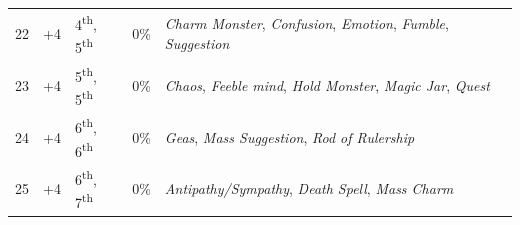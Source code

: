 \begin{minipage}{\columnwidth}
\begin{tabular}{|m{}|m{}|m{}|m{}|m{}|}
22	& +4	& 4\textsuperscript{th}, 5\textsuperscript{th}	& 0\%	& \textit{Charm Monster}, \textit{Confusion}, \textit{Emotion}, \textit{Fumble}, \textit{Suggestion} \\
\rowcolor[gray]{.9}23	& +4	& 5\textsuperscript{th}, 5\textsuperscript{th}	& 0\%	& \textit{Chaos}, \textit{Feeble mind}, \textit{Hold Monster}, \textit{Magic Jar}, \textit{Quest} \\
24	& +4	& 6\textsuperscript{th}, 6\textsuperscript{th}	& 0\%	& \textit{Geas}, \textit{Mass Suggestion}, \textit{Rod of Rulership} \\
\rowcolor[gray]{.9}25	& +4	& 6\textsuperscript{th}, 7\textsuperscript{th}	& 0\%	& \textit{Antipathy/Sympathy}, \textit{Death Spell}, \textit{Mass Charm} \\
\hline
\end{tabular}

\end{minipage}

